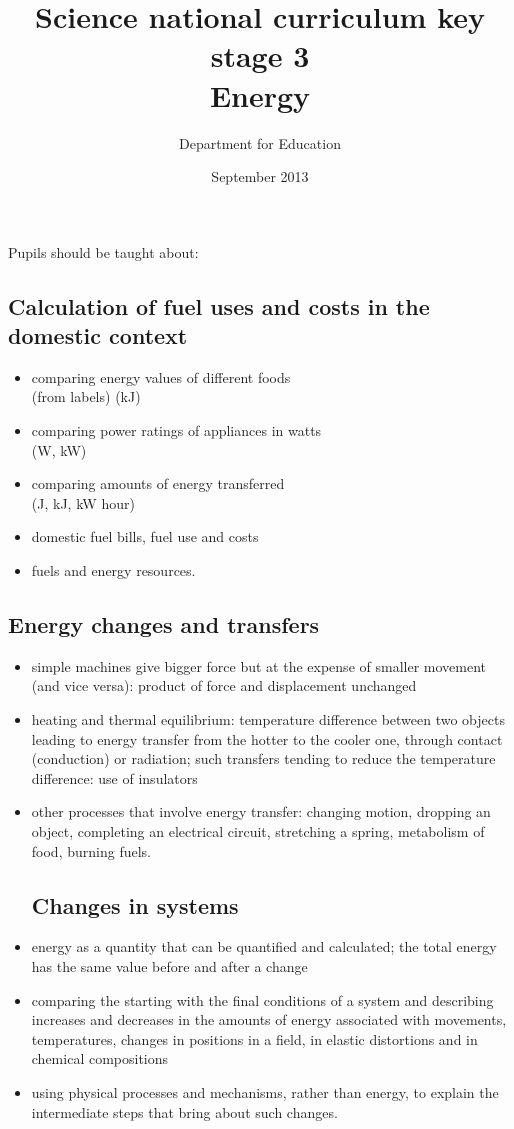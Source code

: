 \documentclass[a4paper,12pt]{article}
\begin{document}
\setcounter{secnumdepth}{0}

\title{Science national curriculum key stage 3\\Energy}
\author{Department for Education}
\date{September 2013}
\maketitle

\thispagestyle{empty}

Pupils should be taught about:

\subsection{Calculation of fuel uses and costs in the domestic context}
\begin{itemize}
\item comparing energy values of different foods\\ (from labels) (kJ)
\item comparing power ratings of appliances in watts\\ (W, kW)
\item comparing amounts of energy transferred\\ (J, kJ, kW hour)
\item domestic fuel bills, fuel use and costs
\item fuels and energy resources.
\end{itemize}
\subsection{Energy changes and transfers}
\begin{itemize}
\item  simple machines give bigger force but at the expense of smaller movement (and vice
versa): product of force and displacement unchanged
\item heating and thermal equilibrium: temperature difference between two objects leading to
energy transfer from the hotter to the cooler one, through contact (conduction) or
radiation; such transfers tending to reduce the temperature difference: use of insulators
\item other processes that involve energy transfer: changing motion, dropping an object,
completing an electrical circuit, stretching a spring, metabolism of food, burning fuels.
\subsection{Changes in systems}
\item energy as a quantity that can be quantified and calculated; the total energy has the
same value before and after a change
\item comparing the starting with the final conditions of a system and describing increases
and decreases in the amounts of energy associated with movements, temperatures,
changes in positions in a field, in elastic distortions and in chemical compositions
\item using physical processes and mechanisms, rather than energy, to explain the
intermediate steps that bring about such changes.
\end{itemize}
\end{document}
